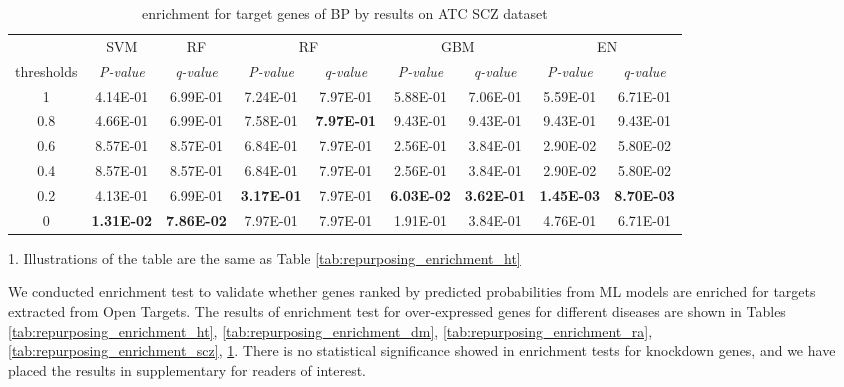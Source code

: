         \begin{table}[htbp]
          \centering
          \caption{enrichment for target genes of BP by results on ATC SCZ dataset}
          \begin{threeparttable}
            \tabcolsep=0.10cm
            \begin{tabular}{ccccccccc}
            \toprule
                  & SVM   & RF    & \multicolumn{2}{c}{RF} & \multicolumn{2}{c}{GBM} & \multicolumn{2}{c}{EN} \\
            thresholds & \textit{P-value} & \textit{q-value} & \textit{P-value} & \textit{q-value} & \textit{P-value} & \textit{q-value} & \textit{P-value} & \textit{q-value} \\
            \midrule
            1     & 4.14E-01 & 6.99E-01 & 7.24E-01 & 7.97E-01 & 5.88E-01 & 7.06E-01 & 5.59E-01 & 6.71E-01 \\
            0.8   & 4.66E-01 & 6.99E-01 & 7.58E-01 & \textbf{7.97E-01} & 9.43E-01 & 9.43E-01 & 9.43E-01 & 9.43E-01 \\
            0.6   & 8.57E-01 & 8.57E-01 & 6.84E-01 & 7.97E-01 & 2.56E-01 & 3.84E-01 & 2.90E-02 & 5.80E-02 \\
            0.4   & 8.57E-01 & 8.57E-01 & 6.84E-01 & 7.97E-01 & 2.56E-01 & 3.84E-01 & 2.90E-02 & 5.80E-02 \\
            0.2   & 4.13E-01 & 6.99E-01 & \textbf{3.17E-01} & 7.97E-01 & \textbf{6.03E-02} & \textbf{3.62E-01} & \textbf{1.45E-03} & \textbf{8.70E-03} \\
            0     & \textbf{1.31E-02} & \textbf{7.86E-02} & 7.97E-01 & 7.97E-01 & 1.91E-01 & 3.84E-01 & 4.76E-01 & 6.71E-01 \\
            \midrule
            \end{tabular}%
            \begin{tablenotes}
              \item 1. Illustrations of the table are the same as Table \ref{tab:repurposing_enrichment_ht}
            \end{tablenotes}
          \end{threeparttable}
          \label{tab:repurposing_enrichment_bp}%
        \end{table}%

    We conducted enrichment test to validate whether genes ranked by predicted probabilities from ML models are enriched for targets extracted from Open Targets. The results of enrichment test for over-expressed genes for different diseases are shown in Tables \ref{tab:repurposing_enrichment_ht}, \ref{tab:repurposing_enrichment_dm}, \ref{tab:repurposing_enrichment_ra}, \ref{tab:repurposing_enrichment_scz}, \ref{tab:repurposing_enrichment_bp}. There is no statistical significance showed in enrichment tests for knockdown genes, and we have placed the results in supplementary for readers of interest. 
    
